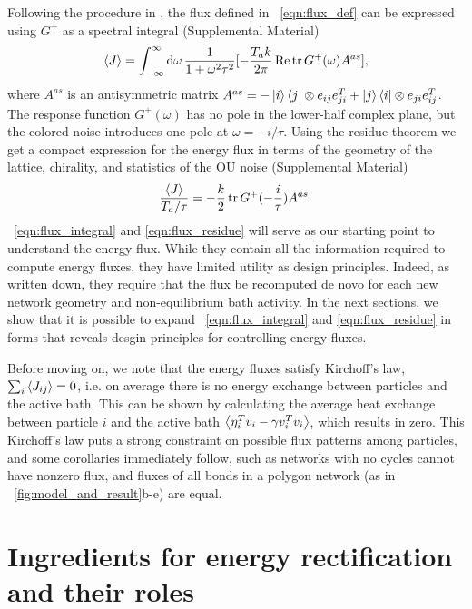 \documentclass[
 preprint,
 preprintnumbers,
 amsmath,amssymb,
 aps,
 pre,
 longbibliography,
 superscriptaddress,
 10pt, twocolumn
]{revtex4-1}
\begin{document}
Following the procedure in \cite{Kundu2011LargeDeviations}, the flux defined in \eqnname~\eqref{eqn:flux_def} can be expressed using $G^+$ as a spectral integral (Supplemental Material)
\begin{equation} \label{eqn:flux_integral}
    \expval{J} = \int_{-\infty}^\infty \dd{\omega} \frac{1}{1+\omega^2\tau^2} [-\frac{T_a k}{2\pi} \Re \tr G^+(\omega)A^{as}] ,
\end{equation}
where $A^{as}$ is an antisymmetric matrix
$A^{as} = -\ket{i}\bra{j} \otimes e_{ij}e_{ji}^T + \ket{j}\bra{i} \otimes e_{ji}e_{ij}^T$.
The response function $G^+(\omega)$ has no pole in the lower-half complex plane, but the colored noise introduces one pole at $\omega = -i/\tau$. Using the residue theorem we get a compact expression for the energy flux in terms of the geometry of the lattice, chirality, and statistics of the OU noise (Supplemental Material)
\begin{equation} \label{eqn:flux_residue}
    \frac{\expval{J}}{T_a/\tau} = -\frac{k}{2} \tr G^+(-\frac{i}{\tau})A^{as} .
\end{equation}
\eqnname~\eqref{eqn:flux_integral} and \eqref{eqn:flux_residue} will serve as our starting point to understand the energy flux. While they contain all the information required to compute energy fluxes, they have limited utility as design principles. Indeed, as written down, they require that the flux be recomputed de novo for each new network geometry and non-equilibrium bath activity. In the next sections, we show that it is possible to expand \eqnname~\eqref{eqn:flux_integral} and \eqref{eqn:flux_residue} in forms that reveals desgin principles for controlling energy fluxes. 

Before moving on, we note that the energy fluxes satisfy Kirchoff's law, $\sum_i \expval{J_{ij}} = 0$, i.e. on average there is no energy exchange between particles and the active bath. This can be shown by calculating the average heat exchange between particle $i$ and the active bath $\expval{\eta_i^T v_i - \gamma v_i^T v_i}$, which results in zero.
This Kirchoff's law puts a strong constraint on possible flux patterns among particles, and some corollaries immediately follow, such as networks with no cycles cannot have nonzero flux, and fluxes of all bonds in a polygon network (as in \figurename~\ref{fig:model_and_result}b-e) are equal.


\section{Ingredients for energy rectification and their roles} \label{sec:fourier}
\end{document}
